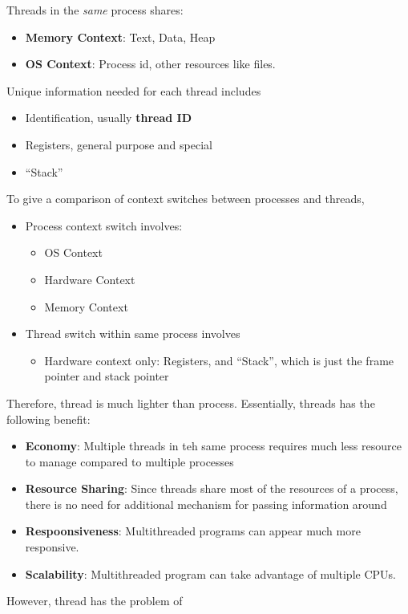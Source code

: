 \documentclass[12pt]{article}
\theoremstyle{definition}
\begin{document}
Threads in the \textit{same} process shares:
\begin{itemize}
  \item \textbf{Memory Context}: Text, Data, Heap
  \item \textbf{OS Context}: Process id, other resources like files.
\end{itemize}
Unique information needed for each thread includes
\begin{itemize}
  \item Identification, usually \textbf{thread ID}
  \item Registers, general purpose and special
  \item ``Stack''
\end{itemize}
To give a comparison of context switches between processes and threads, 
\begin{itemize}
  \item Process context switch involves:
  \begin{itemize}
    \item OS Context
    \item Hardware Context
    \item Memory Context
  \end{itemize}
  \item Thread switch within same process involves
  \begin{itemize}
    \item Hardware context only: Registers, and ``Stack'', which is just the frame pointer and stack pointer
  \end{itemize}
\end{itemize}
Therefore, thread is much lighter than process. Essentially, threads has the following benefit:
\begin{itemize}
  \item \textbf{Economy}: Multiple threads in teh same process requires much less resource to manage compared to multiple processes
  \item \textbf{Resource Sharing}: Since threads share most of the resources of a process, there is no need for additional mechanism for passing information around
  \item \textbf{Respoonsiveness}: Multithreaded programs can appear much more responsive.
  \item \textbf{Scalability}: Multithreaded program can take advantage of multiple CPUs.
\end{itemize}
However, thread has the problem of
\end{document}
